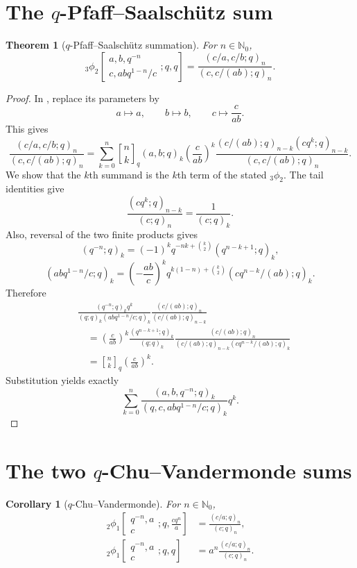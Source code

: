 \documentclass[11pt,oneside,openany]{book}
\newtheorem{theorem}{Theorem}[chapter]
\newtheorem{corollary}[corollary]{Corollary}
\theoremstyle{definition}
\theoremstyle{remark}
\newcommand{\qbinom}[2]{\genfrac{[}{]}{0pt}{}{#1}{#2}_{q}}
\newcommand{\N}{\mathbb N}
\begin{document}
\section{The \texorpdfstring{$q$}{q}-Pfaff--Saalsch\"utz sum}

\begin{theorem}[$q$-Pfaff--Saalsch\"utz summation]\label{thm:q-pfaff}
For $n\in\N_0$,
\[
 {}_3\phi_2\!\left[
 \begin{matrix}a,b,q^{-n}\\c,abq^{1-n}/c\end{matrix};q,q\right]
 =\frac{(c/a,c/b;q)_n}{(c,c/(ab);q)_n}.
\]
\end{theorem}

\begin{proof}
In , replace its parameters by
\[
 a\mapsto a,\qquad b\mapsto b,\qquad c\mapsto \frac{c}{ab}.
\]
This gives
\[
 \frac{(c/a,c/b;q)_n}{(c,c/(ab);q)_n}
 =\sum_{k=0}^{n}\qbinom nk(a,b;q)_k
 \left(\frac{c}{ab}\right)^k
 \frac{(c/(ab);q)_{n-k}(cq^k;q)_{n-k}}
 {(c,c/(ab);q)_n}.
\]
We show that the $k$th summand is the $k$th term of the stated ${}_3\phi_2$.  The tail identities give
\[
 \frac{(cq^k;q)_{n-k}}{(c;q)_n}=\frac1{(c;q)_k}.
\]
Also, reversal of the two finite products gives
\[
 (q^{-n};q)_k
 =(-1)^kq^{-nk+\binom k2}(q^{n-k+1};q)_k,
\]
\[
 (abq^{1-n}/c;q)_k
 =\left(-\frac{ab}{c}\right)^k
 q^{k(1-n)+\binom k2}
 (cq^{n-k}/(ab);q)_k.
\]
Therefore
\begin{align*}
 &\frac{(q^{-n};q)_k q^k}{(q;q)_k(abq^{1-n}/c;q)_k}
 \frac{(c/(ab);q)_n}{(c/(ab);q)_{n-k}}\\
 &\quad=\left(\frac{c}{ab}\right)^k
 \frac{(q^{n-k+1};q)_k}{(q;q)_k}
 \frac{(c/(ab);q)_n}
 {(c/(ab);q)_{n-k}(cq^{n-k}/(ab);q)_k}\\
 &\quad=\qbinom nk\left(\frac{c}{ab}\right)^k.
\end{align*}
Substitution yields exactly
\[
 \sum_{k=0}^{n}
 \frac{(a,b,q^{-n};q)_k}{(q,c,abq^{1-n}/c;q)_k}q^k.
\]
\end{proof}

\section{The two \texorpdfstring{$q$}{q}-Chu--Vandermonde sums}

\begin{corollary}[$q$-Chu--Vandermonde]\label{cor:q-chu}
For $n\in\N_0$,
\begin{align}
 {}_2\phi_1\!\left[
 \begin{matrix}q^{-n},a\\c\end{matrix};q,\frac{cq^n}{a}\right]
 &=\frac{(c/a;q)_n}{(c;q)_n},\label{eq:qchu1}\\
 {}_2\phi_1\!\left[
 \begin{matrix}q^{-n},a\\c\end{matrix};q,q\right]
 &=a^n\frac{(c/a;q)_n}{(c;q)_n}.
 \label{eq:qchu2}
\end{align}
\end{corollary}
\end{document}

